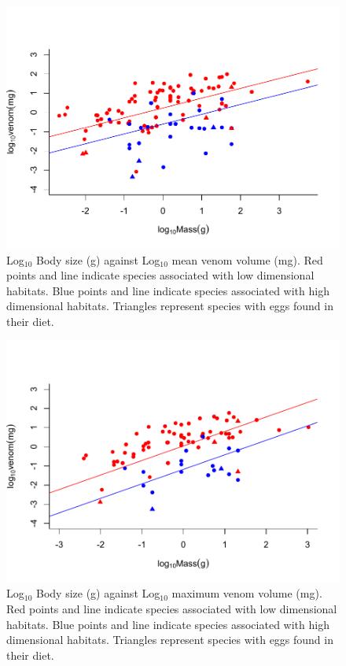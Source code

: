 \begin{figure}[h!]
  \centering
  \includegraphics[width=.95\textwidth]{ch4-snakes/figure2aver.pdf}%
  \caption[ ]{Log$_{10}$ Body size (g) against Log$_{10}$ mean venom volume (mg). Red points and line indicate species associated with low dimensional habitats. Blue points and line indicate species associated with high dimensional habitats. Triangles represent species with eggs found in their diet.}
  \label{fig:Figure 4.2.}
\end{figure}




\begin{figure}[h!]
  \centering
  \includegraphics[width=.95\textwidth]{ch4-snakes/figure2max.pdf}%
  \caption[ ]{Log$_{10}$ Body size (g) against Log$_{10}$ maximum venom volume (mg). Red points and line indicate species associated with low dimensional habitats. Blue points and line indicate species associated with high dimensional habitats. Triangles represent species with eggs found in their diet.}
  \label{fig:Figure 4.3.}
\end{figure}



